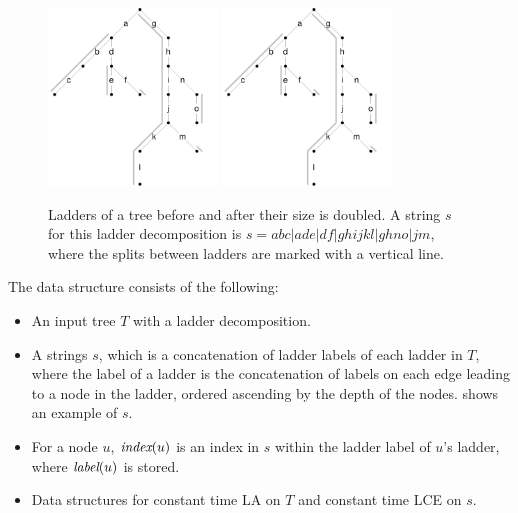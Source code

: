 \documentclass[a4]{article}
\newcommand*{\pref}{\prettyref}
\begin{document}
\begin{figure}[tp]
    \begin{center}
        \includegraphics[width=0.4\textwidth,page=1]{ladder.pdf}
        \includegraphics[width=0.4\textwidth,page=2]{ladder.pdf}
    \end{center}
    \caption{\label{fig:ladder-ds} Ladders of a tree before and after their size is doubled. A  string $s$ for this ladder decomposition is $s=abc|ade|df|ghijkl|ghno|jm$, where the splits between ladders are marked with a vertical line.}
\end{figure}

The  data structure consists of the following:
\begin{itemize}
\item An input tree $T$ with a ladder decomposition.
\item A strings $s$, which is a concatenation of ladder labels of each ladder in $T$, where the label of a ladder is the concatenation of labels on each edge leading to a node in the ladder, ordered ascending by the depth of the nodes. \pref{fig:ladder-ds} shows an example of $s$.
\item For a node $u$, $\textit{index}(u)$ is an index in $s$ within the ladder label of $u$'s ladder, where $\textit{label}(u)$ is stored.
\item Data structures for constant time LA on $T$ and constant time LCE on $s$.
\end{itemize}
\end{document}
